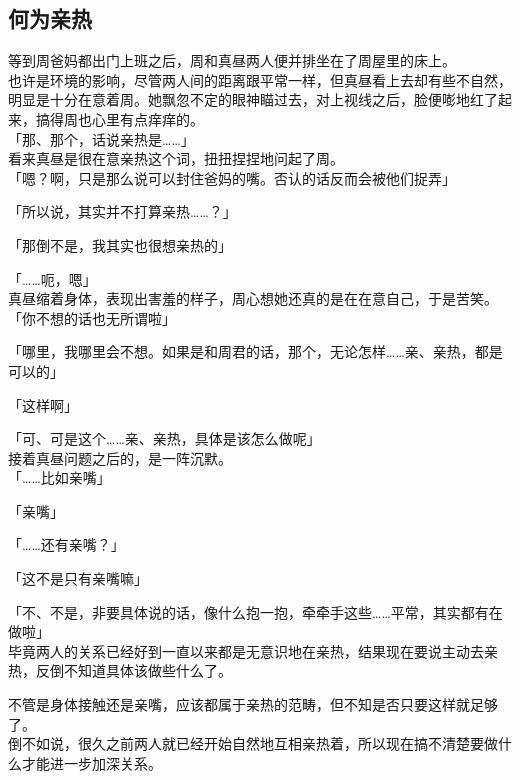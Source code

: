 \subsection{何为亲热}

等到周爸妈都出门上班之后，周和真昼两人便并排坐在了周屋里的床上。\\

也许是环境的影响，尽管两人间的距离跟平常一样，但真昼看上去却有些不自然，明显是十分在意着周。她飘忽不定的眼神瞄过去，对上视线之后，脸便嘭地红了起来，搞得周也心里有点痒痒的。\\

「那、那个，话说亲热是……」\\

看来真昼是很在意亲热这个词，扭扭捏捏地问起了周。\\

「嗯？啊，只是那么说可以封住爸妈的嘴。否认的话反而会被他们捉弄」

「所以说，其实并不打算亲热……？」

「那倒不是，我其实也很想亲热的」

「……呃，嗯」\\

真昼缩着身体，表现出害羞的样子，周心想她还真的是在在意自己，于是苦笑。\\

「你不想的话也无所谓啦」

「哪里，我哪里会不想。如果是和周君的话，那个，无论怎样……亲、亲热，都是可以的」

「这样啊」

「可、可是这个……亲、亲热，具体是该怎么做呢」\\

接着真昼问题之后的，是一阵沉默。\\

「……比如亲嘴」

「亲嘴」

「……还有亲嘴？」

「这不是只有亲嘴嘛」

「不、不是，非要具体说的话，像什么抱一抱，牵牵手这些……平常，其实都有在做啦」\\

毕竟两人的关系已经好到一直以来都是无意识地在亲热，结果现在要说主动去亲热，反倒不知道具体该做些什么了。

不管是身体接触还是亲嘴，应该都属于亲热的范畴，但不知是否只要这样就足够了。\\

倒不如说，很久之前两人就已经开始自然地互相亲热着，所以现在搞不清楚要做什么才能进一步加深关系。\\

